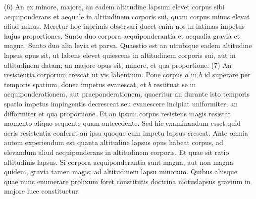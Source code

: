 (6) An  ex minore, majore, an eadem altitudine lapsum elevet corpus sibi aequiponderans et aequale in altitudinem corporis sui, quam corpus minus elevat aliud  minus. Meretur hoc inprimis observari ducet enim nos in intimas impetus\protect{} hujus proportiones\protect{}.
\pend
\pstart 
Sunto duo corpora  aequiponderantia et aequalia gravia et magna. Sunto duo alia levia et parva. Quaestio est an utrobique eadem altitudine lapsus\protect{} opus sit, ut labens elevet quiescens in altitudinem corporis sui, aut in altitudinem datam; an  majore opus sit,  minore, et qua proportione\protect{}.
\pend
\pstart 
(7) An resistentia corporum\protect{}  crescat ut vis\protect{} labentium. Pone corpus $a$  in $b$  id superare per  temporis spatium, donec impetus\protect{} evanescat, et $b$ restituat se in aequiponderationem, aut praeponderationem, quaeritur an durante isto temporis spatio impetus\protect{} impingentis decresceat seu evanescere incipiat uniformiter, an difformiter et qua proportione. Et an ipsum corpus resistens magis resistat momento\protect{} aliquo sequente quam antecedente.
\pend
\pstart 
Sed hic examinandum esset quid aeris resistentia\protect{} conferat an ipsa quoque cum impetu\protect{} lapsus\protect{}  crescat.
\pend
\pstart 
Ante omnia autem experiendum est quanta altitudine lapsus\protect{} opus habeat corpus, ad elevandum aliud aequiponderans in altitudinem corporis. Et quae sit ratio altitudinis lapsus\protect{}. Si corpora aequiponderantia sunt magna, aut non magna quidem, gravia tamen magis; ad altitudinem lapsu minorum.
\pend
\pstart  
Quibus aliisque quae nunc enumerare prolixum foret constitutis doctrina motuslapsus\protect{} gravium\protect{} in majore luce constituetur.
\pend
\count{}
\count{}
